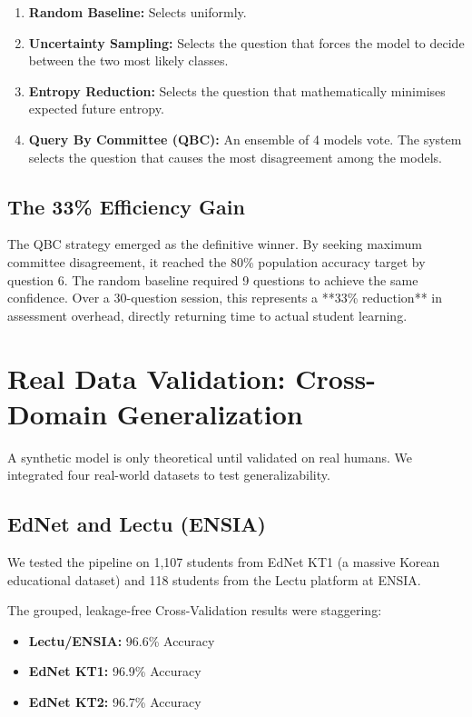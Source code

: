 \documentclass[11pt,a4paper]{article}
\begin{document}
\begin{enumerate}
    \item \textbf{Random Baseline:} Selects uniformly.
    \item \textbf{Uncertainty Sampling:} Selects the question that forces the model to decide between the two most likely classes.
    \item \textbf{Entropy Reduction:} Selects the question that mathematically minimises expected future entropy.
    \item \textbf{Query By Committee (QBC):} An ensemble of 4 models vote. The system selects the question that causes the most disagreement among the models.
\end{enumerate}

\subsection{The 33\% Efficiency Gain}
The QBC strategy emerged as the definitive winner. By seeking maximum committee disagreement, it reached the 80\% population accuracy target by question 6. The random baseline required 9 questions to achieve the same confidence. Over a 30-question session, this represents a **33\% reduction** in assessment overhead, directly returning time to actual student learning.

\section{Real Data Validation: Cross-Domain Generalization}
A synthetic model is only theoretical until validated on real humans. We integrated four real-world datasets to test generalizability.

\subsection{EdNet and Lectu (ENSIA)}
We tested the pipeline on 1,107 students from EdNet KT1 (a massive Korean educational dataset) and 118 students from the Lectu platform at ENSIA. 

The grouped, leakage-free Cross-Validation results were staggering:
\begin{itemize}[label=\textcolor{primaryblue}{\textbullet}]
    \item \textbf{Lectu/ENSIA:} 96.6\% Accuracy
    \item \textbf{EdNet KT1:} 96.9\% Accuracy
    \item \textbf{EdNet KT2:} 96.7\% Accuracy
\end{itemize}
\end{document}
